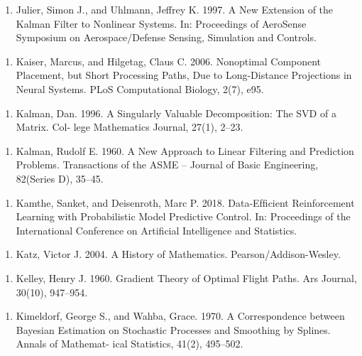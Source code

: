 \begin{enumerate}
\item Julier, Simon J., and Uhlmann, Jeffrey K. 1997. A New Extension of the Kalman Filter to Nonlinear Systems. In: Proceedings of AeroSense Symposium on Aerospace/Defense Sensing, Simulation and Controls.
\end{enumerate}

\begin{enumerate}
\item Kaiser, Marcus, and Hilgetag, Claus C. 2006. Nonoptimal Component Placement, but Short Processing Paths, Due to Long-Distance Projections in Neural Systems. PLoS Computational Biology, 2(7), e95.
\end{enumerate}

\begin{enumerate}
\item Kalman, Dan. 1996. A Singularly Valuable Decomposition: The SVD of a Matrix. Col- lege Mathematics Journal, 27(1), 2–23.
\end{enumerate}

\begin{enumerate}
\item Kalman, Rudolf E. 1960. A New Approach to Linear Filtering and Prediction Problems. Transactions of the ASME – Journal of Basic Engineering, 82(Series D), 35–45.
\end{enumerate}

\begin{enumerate}
\item Kamthe, Sanket, and Deisenroth, Marc P. 2018. Data-Efﬁcient Reinforcement Learning with Probabilistic Model Predictive Control. In: Proceedings of the International Conference on Artiﬁcial Intelligence and Statistics.
\end{enumerate}

\begin{enumerate}
\item Katz, Victor J. 2004. A History of Mathematics. Pearson/Addison-Wesley.
\end{enumerate}

\begin{enumerate}
\item Kelley, Henry J. 1960. Gradient Theory of Optimal Flight Paths. Ars Journal, 30(10), 947–954.
\end{enumerate}

\begin{enumerate}
\item Kimeldorf, George S., and Wahba, Grace. 1970. A Correspondence between Bayesian Estimation on Stochastic Processes and Smoothing by Splines. Annals of Mathemat- ical Statistics, 41(2), 495–502.
\end{enumerate}

